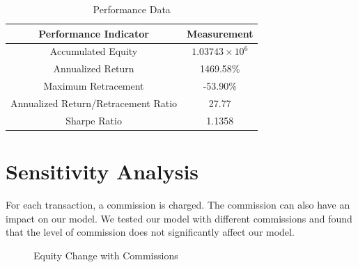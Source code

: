\documentclass[12pt,a4paper]{article}
\begin{document}
\begin{spacing}{1.2}
\begin{table}[H]
	\renewcommand{\arraystretch}{1.5}
	\caption{Performance Data}
	\label{table:performance}
	\begin{center}
		{\footnotesize
			\begin{tabular}{c c }
				\toprule
				Performance Indicator & Measurement\\
				\midrule
				Accumulated Equity & $1.03743 \times 10^6$ \\
				Annualized Return & 1469.58\% \\
				Maximum Retracement & -53.90\% \\
				Annualized Return/Retracement Ratio & 27.77 \\
				Sharpe Ratio & 1.1358 \\
				\bottomrule
		\end{tabular}}
	\end{center}	
\end{table}



\section{Sensitivity Analysis}
\label{SensitivityAnalysis}

For each transaction, a commission is charged. The commission can also have an impact on our model. We tested our model with different commissions and found that the level of commission does not significantly affect our model.

 \begin{figure}[H]
	\caption{Equity Change with Commissions}
	\label{figure:sensitive_test}
\end{figure}


\end{spacing}
\end{document}
